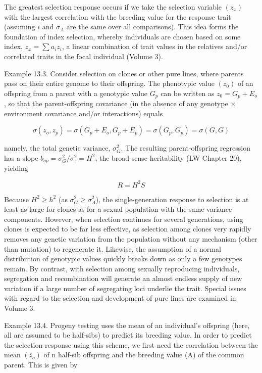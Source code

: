 \documentclass{article}
\begin{document}
The greatest selection response occurs if we take the selection variable  $ (z_x) $ with the largest correlation with the breeding value for the response trait (assuming  $ \bar{i} $ and  $ \sigma_A $ are the same over all comparisons). This idea forms the foundation of index selection, whereby individuals are chosen based on some index,  $ z_x = \sum a_i z_i $, a linear combination of trait values in the relatives and/or correlated traits in the focal individual (Volume 3).

Example 13.3. Consider selection on clones or other pure lines, where parents pass on their entire genome to their offspring. The phenotypic value  $ (z_0) $ of an offspring from a parent with a genotypic value  $ G_p $ can be written as  $ z_0 = G_p + E_o $, so that the parent-offspring covariance (in the absence of any genotype  $ \times $ environment covariance and/or interactions) equals

\begin{equation}
\sigma(z_{o},z_{p})=\sigma(G_{p}+E_{o},G_{p}+E_{p})=\sigma(G_{p},G_{p})=\sigma(G,G)
\end{equation}

namely, the total genetic variance,  $ \sigma_G^2 $. The resulting parent-offspring regression has a slope  $ b_{op} = \sigma_G^2 / \sigma_z^2 = H^2 $, the broad-sense heritability (LW Chapter 20), yielding

\begin{equation}
R=H^{2}S
\end{equation}

Because  $ H^2 \geq h^2 $ (as  $ \sigma_G^2 \geq \sigma_A^2 $), the single-generation response to selection is at least as large for clones as for a sexual population with the same variance components. However, when selection continues for several generations, using clones is expected to be far less effective, as selection among clones very rapidly removes any genetic variation from the population without any mechanism (other than mutation) to regenerate it. Likewise, the assumption of a normal distribution of genotypic values quickly breaks down as only a few genotypes remain. By contrast, with selection among sexually reproducing individuals, segregation and recombination will generate an almost endless supply of new variation if a large number of segregating loci underlie the trait. Special issues with regard to the selection and development of pure lines are examined in Volume 3.

Example 13.4. Progeny testing uses the mean of an individual's offspring (here, all are assumed to be half-sibs) to predict its breeding value. In order to predict the selection response using this scheme, we first need the correlation between the mean  $ (\overline{z}_{o}) $ of n half-sib offspring and the breeding value (A) of the common parent. This is given by
\end{document}
